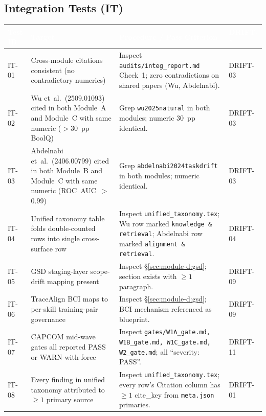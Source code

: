 \documentclass[11pt,letterpaper]{article}
\newcommand{\tableheader}[1]{\textbf{\sffamily\textcolor{white}{#1}}}
\begin{document}
\subsection{Integration Tests (IT)}
\label{sec:test-plan:it}

\begin{center}
\small
\begin{tabularx}{\textwidth}{L{1.8cm}L{4.4cm}XL{1.8cm}}
\toprule
{}
\tableheader{Test ID} & \tableheader{Target} & \tableheader{Procedure / Pass Criterion} & \tableheader{DRIFT-*} \\
\midrule
IT-01 & Cross-module citations consistent (no contradictory numerics) & Inspect \texttt{audits/integ\_report.md} Check~1; zero contradictions on shared papers (Wu, Abdelnabi). & DRIFT-03 \\
IT-02 & Wu et~al.\ (2509.01093) cited in both Module~A and Module~C with same numeric ($>$30~pp BoolQ) & Grep \texttt{wu2025natural} in both modules; numeric 30~pp identical. & DRIFT-03 \\
IT-03 & Abdelnabi et~al.\ (2406.00799) cited in both Module~B and Module~C with same numeric (ROC~AUC~$>$0.99) & Grep \texttt{abdelnabi2024taskdrift} in both modules; numeric identical. & DRIFT-03 \\
IT-04 & Unified taxonomy table folds double-counted rows into single cross-surface row & Inspect \texttt{unified\_taxonomy.tex}; Wu row marked \texttt{knowledge \& retrieval}; Abdelnabi row marked \texttt{alignment \& retrieval}. & DRIFT-04 \\
IT-05 & GSD staging-layer scope-drift mapping present & Inspect \S\ref{sec:module-d:gsd}; section exists with $\geq 1$ paragraph. & DRIFT-09 \\
IT-06 & TraceAlign BCI maps to per-skill training-pair governance & Inspect \S\ref{sec:module-d:gsd}; BCI mechanism referenced as blueprint. & DRIFT-09 \\
IT-07 & CAPCOM mid-wave gates all reported PASS or WARN-with-force & Inspect \texttt{gates/W1A\_gate.md, W1B\_gate.md, W1C\_gate.md, W2\_gate.md}; all ``severity: PASS''. & DRIFT-11 \\
IT-08 & Every finding in unified taxonomy attributed to $\geq 1$ primary source & Inspect \texttt{unified\_taxonomy.tex}; every row's Citation column has $\geq 1$ cite\_key from \texttt{meta.json} primaries. & DRIFT-01 \\
\bottomrule
\end{tabularx}
\end{center}
\end{document}
